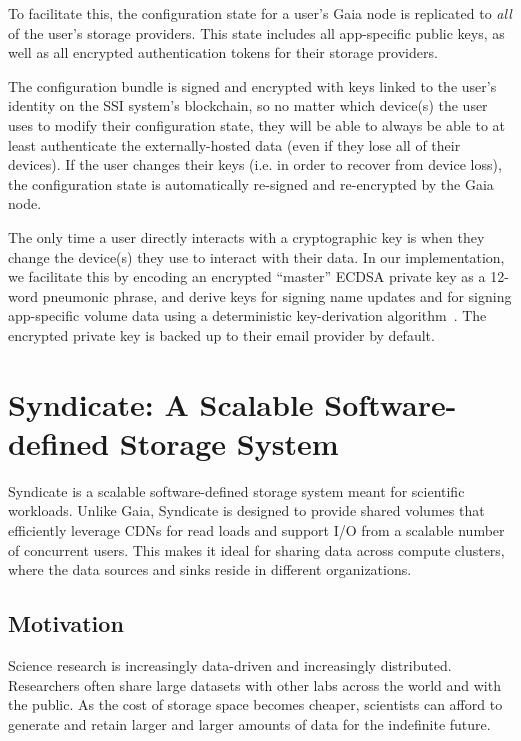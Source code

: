 To facilitate this, the configuration state for a user's Gaia node is replicated to \textit{all} of
the user's storage providers.  This state includes all app-specific public keys,
as well as all encrypted authentication tokens for their storage providers.

The configuration bundle is signed and encrypted with keys linked to
the user's identity on the SSI system's blockchain, so no matter which device(s) the user
uses to modify their configuration state, they will be able to always be able to
at least authenticate the externally-hosted data (even if they lose all of their
devices).  If the user changes their keys (i.e. in order to recover from device
loss), the configuration state is
automatically re-signed and re-encrypted by the Gaia node.

The only time a user directly interacts with a cryptographic key is when they
change the device(s) they use to interact with their data.
In our implementation, we facilitate this by
encoding an encrypted ``master'' ECDSA private key as a 12-word pneumonic phrase, and derive keys
for signing name updates and for signing app-specific volume data
using a deterministic key-derivation
algorithm~\cite{bip39}.  The encrypted private key is backed up to their email provider by
default.

\section{Syndicate: A Scalable Software-defined Storage System}

Syndicate is a scalable software-defined storage system meant for scientific
workloads.  Unlike Gaia, Syndicate is designed to provide shared volumes that
efficiently leverage CDNs for read loads and 
support I/O from a scalable number of concurrent users.  This makes
it ideal for sharing data across compute clusters, where the data sources and
sinks reside in different organizations.

\subsection{Motivation}

Science research is increasingly data-driven and increasingly distributed.
Researchers often share large datasets with other labs across the world and 
with the public.  As the cost of storage space becomes cheaper, scientists can
afford to generate and retain larger and larger amounts of data for the
indefinite future.

